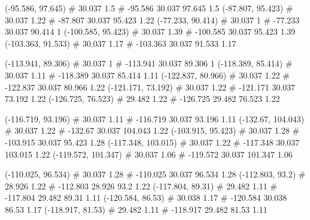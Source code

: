 \documentclass[a4paper,openbib,10pt]{article}
\newenvironment{treegraph}{\begin{graph}}{\end{graph}}
\begin{document}
\begin{treegraph}
  (-95.586, 97.645) #     30.037    1.5
   #    -95.586    30.037    97.645    1.5
  (-87.807, 95.423) #     30.037    1.22
   #    -87.807    30.037    95.423    1.22
  (-77.233, 90.414) #     30.037    1
   #    -77.233    30.037    90.414    1
  (-100.585, 95.423) #     30.037    1.39
   #    -100.585    30.037    95.423    1.39
  (-103.363, 91.533) #     30.037    1.17
   #    -103.363    30.037    91.533    1.17

  (-113.941, 89.306) #     30.037    1
   #    -113.941    30.037    89.306    1
  (-118.389, 85.414) #     30.037    1.11
   #    -118.389    30.037    85.414    1.11
  (-122.837, 80.966) #     30.037    1.22
   #    -122.837    30.037    80.966    1.22
  (-121.171, 73.192) #     30.037    1.22
   #    -121.171    30.037    73.192    1.22
  (-126.725, 76.523) #     29.482    1.22
   #    -126.725    29.482    76.523    1.22

  (-116.719, 93.196) #     30.037    1.11
   #    -116.719    30.037    93.196    1.11
  (-132.67, 104.043) #     30.037    1.22
   #    -132.67    30.037    104.043    1.22
  (-103.915, 95.423) #     30.037    1.28
   #    -103.915    30.037    95.423    1.28
  (-117.348, 103.015) #     30.037    1.22
   #    -117.348    30.037    103.015    1.22
  (-119.572, 101.347) #     30.037    1.06
   #    -119.572    30.037    101.347    1.06

  (-110.025, 96.534) #     30.037    1.28
   #    -110.025    30.037    96.534    1.28
  (-112.803, 93.2) #     28.926    1.22
   #    -112.803    28.926    93.2    1.22
  (-117.804, 89.31) #     29.482    1.11
   #    -117.804    29.482    89.31    1.11
  (-120.584, 86.53) #     30.038    1.17
   #    -120.584    30.038    86.53    1.17
  (-118.917, 81.53) #     29.482    1.11
   #    -118.917    29.482    81.53    1.11


\end{treegraph}
\end{document}
